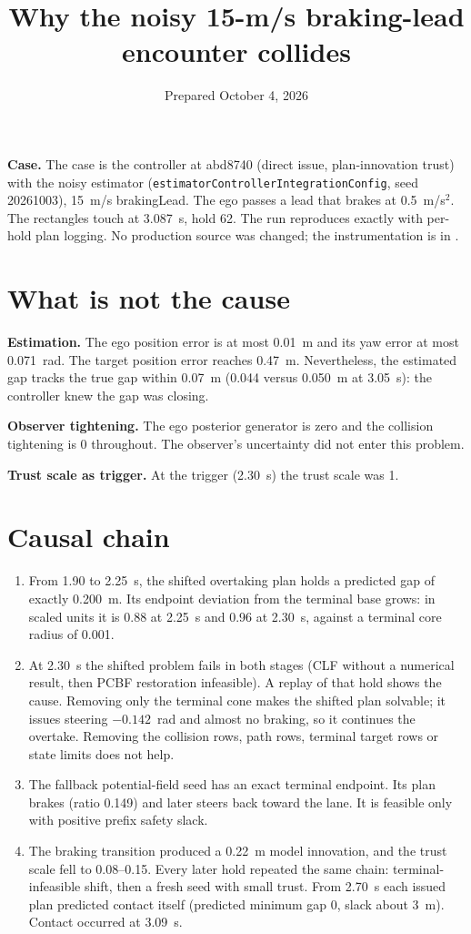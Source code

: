 \documentclass[11pt]{article}
\title{Why the noisy 15-m/s braking-lead encounter collides}
\date{Prepared October 4, 2026}
\begin{document}
\maketitle

\textbf{Case.} The case is the controller at abd8740 (direct issue, plan-innovation trust) with
the noisy estimator (\texttt{estimatorControllerIntegrationConfig}, seed
20261003), 15~m/s brakingLead. The ego passes a lead that brakes at 0.5~m/s$^2$. The rectangles touch at 3.087~s,
hold 62. The run reproduces exactly with per-hold plan logging. No production
source was changed; the instrumentation is in .

\section{What is not the cause}
\textbf{Estimation.} The ego position error is at most 0.01~m and its yaw error
at most 0.071~rad. The target position error reaches 0.47~m. Nevertheless, the
estimated gap tracks the true gap within 0.07~m (0.044 versus 0.050~m at
3.05~s): the controller knew the gap was closing.

\textbf{Observer tightening.} The ego posterior generator is zero and the
collision tightening is 0 throughout. The observer's uncertainty did not enter
this problem.

\textbf{Trust scale as trigger.} At the trigger (2.30~s) the trust scale was 1.

\section{Causal chain}
\begin{enumerate}
\item From 1.90 to 2.25~s, the shifted overtaking plan holds a predicted gap of
  exactly 0.200~m. Its endpoint deviation from the terminal base grows: in
  scaled units it is 0.88 at 2.25~s and 0.96 at 2.30~s, against a terminal core
  radius of 0.001.
\item At 2.30~s the shifted problem fails in both stages (CLF without a
  numerical result, then PCBF restoration infeasible). A replay of that hold
  shows the cause. Removing only the terminal cone makes the shifted plan
  solvable; it issues steering $-0.142$~rad and almost no braking, so it
  continues the overtake. Removing the collision rows, path rows, terminal
  target rows or state limits does not help.
\item The fallback potential-field seed has an exact terminal endpoint. Its
  plan brakes (ratio 0.149) and later steers back toward the lane. It is
  feasible only with positive prefix safety slack.
\item The braking transition produced a 0.22~m model innovation, and the trust
  scale fell to 0.08--0.15. Every later hold repeated the same chain:
  terminal-infeasible shift, then a fresh seed with small trust. From 2.70~s
  each issued plan predicted contact itself (predicted minimum gap 0, slack
  about 3~m). Contact occurred at 3.09~s.
\end{enumerate}
\end{document}
